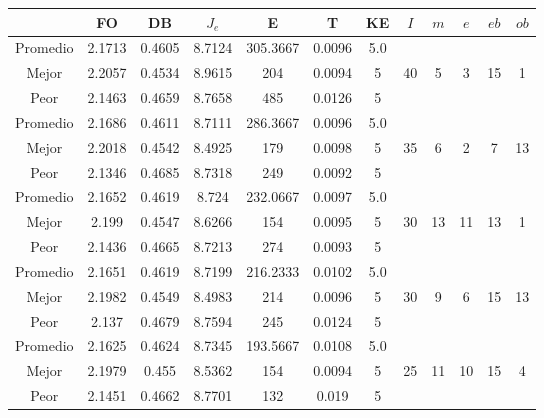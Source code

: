 \begin{table}[h!]
    \footnotesize
    \begin{center}
        \begin{tabular}{|c|c|c|c|c|c|c|c|c|c|c|c|}
        \hline
             & {\bf FO} & {\bf DB} & $J_e$ & {\bf E} & {\bf T} & {\bf KE} & $I$ & $m$ & $e$ & $eb$ & $ob$ \\
        \hline
        \hline
            Promedio  & 2.1713 & 0.4605 & 8.7124 & 305.3667 & 0.0096 & 5.0 &  &  &  &  & \\
            \cline{1-7}
            Mejor & 2.2057 & 0.4534  & 8.9615 & 204 & 0.0094 & 5 & 40 & 5 & 3 & 15 & 1\\
            \cline{1-7}
            Peor & 2.1463 & 0.4659  & 8.7658 & 485 & 0.0126 & 5 &  &  &  &  & \\
        \hline
        \hline
            Promedio  & 2.1686 & 0.4611 & 8.7111 & 286.3667 & 0.0096 & 5.0 &  &  &  &  & \\
            \cline{1-7}
            Mejor & 2.2018 & 0.4542  & 8.4925 & 179 & 0.0098 & 5 & 35 & 6 & 2 & 7 & 13\\
            \cline{1-7}
            Peor & 2.1346 & 0.4685  & 8.7318 & 249 & 0.0092 & 5 &  &  &  &  & \\
        \hline
        \hline
            Promedio  & 2.1652 & 0.4619 & 8.724 & 232.0667 & 0.0097 & 5.0 &  &  &  &  & \\
            \cline{1-7}
            Mejor & 2.199 & 0.4547  & 8.6266 & 154 & 0.0095 & 5 & 30 & 13 & 11 & 13 & 1\\
            \cline{1-7}
            Peor & 2.1436 & 0.4665  & 8.7213 & 274 & 0.0093 & 5 &  &  &  &  & \\
        \hline
        \hline
            Promedio  & 2.1651 & 0.4619 & 8.7199 & 216.2333 & 0.0102 & 5.0 &  &  &  &  & \\
            \cline{1-7}
            Mejor & 2.1982 & 0.4549  & 8.4983 & 214 & 0.0096 & 5 & 30 & 9 & 6 & 15 & 13\\
            \cline{1-7}
            Peor & 2.137 & 0.4679  & 8.7594 & 245 & 0.0124 & 5 &  &  &  &  & \\
        \hline
        \hline
            Promedio  & 2.1625 & 0.4624 & 8.7345 & 193.5667 & 0.0108 & 5.0 &  &  &  &  & \\
            \cline{1-7}
            Mejor & 2.1979 & 0.455  & 8.5362 & 154 & 0.0094 & 5 & 25 & 11 & 10 & 15 & 4\\
            \cline{1-7}
            Peor & 2.1451 & 0.4662  & 8.7701 & 132 & 0.019 & 5 &  &  &  &  & \\

\end{tabular}
\end{center}
\end{table}
